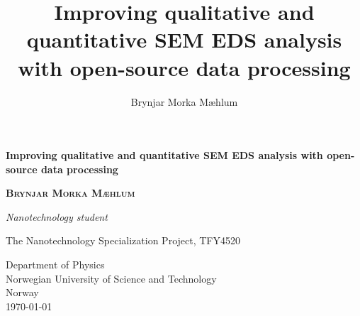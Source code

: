 \title{Improving qualitative and quantitative SEM EDS analysis with open-source data processing}
\author{Brynjar Morka Mæhlum}

\begin{titlepage}
    \begin{center}
        \pagecolor{titlepaperbg}  %
        \color{titletext}  %
        \vspace*{5cm}


        \textbf{\Huge \color{titletext} Improving qualitative and quantitative SEM EDS analysis with open-source data processing}
        \vspace{3.5cm}

        \textbf{\Large \scshape Brynjar Morka Mæhlum}

        \vspace{0.2cm}
        \textit{Nanotechnology student}

        \vspace{1.5cm}

        \vfill

        The Nanotechnology Specialization Project,  TFY4520

        \vspace{0.5cm}


        Department of Physics \\
        Norwegian University of Science and Technology \\
        Norway \\
        \today

    \end{center}
\end{titlepage}